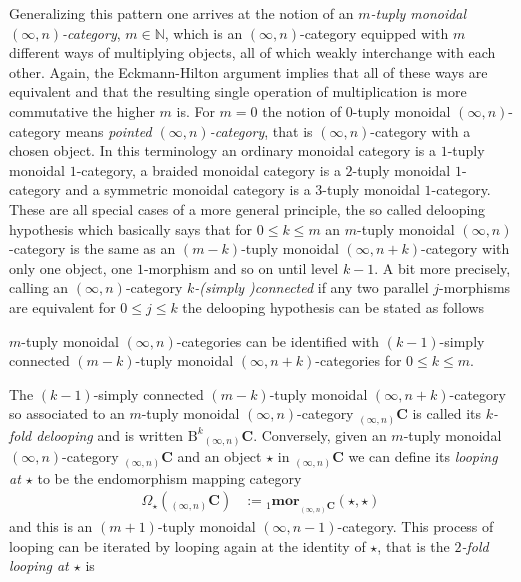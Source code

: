 \begin{itemize}
Generalizing this pattern one arrives at the notion of an \textit{$m$-tuply monoidal $(\infty,n)$-category}, $m \in \mathbb{N}$, which is an $(\infty,n)$-category equipped with $m$ different ways of multiplying objects, all of which weakly interchange with each other. Again, the Eckmann-Hilton argument implies that all of these ways are equivalent and that the resulting {\glqq}single{\grqq} operation of multiplication is more commutative the higher $m$ is. For $m=0$ the notion of $0$-tuply monoidal $(\infty,n)$-category means \textit{pointed $(\infty,n)$-category}, that is $(\infty,n)$-category with a chosen object. In this terminology an ordinary monoidal category is a $1$-tuply monoidal $1$-category, a braided monoidal category is a $2$-tuply monoidal $1$-category and a symmetric monoidal category is a $3$-tuply monoidal $1$-category. These are all special cases of a more general principle, the so called delooping hypothesis which basically says that for $0 \leq k \leq m$ an $m$-tuply monoidal $(\infty,n)$-category is the same as an $(m-k)$-tuply monoidal $(\infty,n+k)$-category with only one object, one $1$-morphism and so on until level $k-1$. A bit more precisely, calling an $(\infty,n)$-category \textit{$k$-(simply )connected} if any two parallel $j$-morphisms are equivalent for $0 \leq j \leq k$ the delooping hypothesis can be stated as follows
\\
\begin{prp}
\label{prp:deloophyp}
$m$-tuply monoidal $(\infty,n)$-categories can be identified with $(k-1)$-simply connected $(m-k)$-tuply monoidal $(\infty,n+k)$-categories for $0 \leq k \leq m$.
\end{prp}
The $(k-1)$-simply connected $(m-k)$-tuply monoidal $(\infty,n+k)$-category so associated to an $m$-tuply monoidal $(\infty,n)$-category ${_{(\infty,n)}}\mathbf{C}$ is called its \textit{$k$-fold delooping} and is written $\mathrm{B}^{k}{_{(\infty,n)}}\mathbf{C}$. Conversely, given an $m$-tuply monoidal $(\infty,n)$-category ${_{(\infty,n)}}\mathbf{C}$ and an object $\star$ in ${_{(\infty,n)}}\mathbf{C}$ we can define its \textit{looping at $\star$} to be the endomorphism mapping category
\begin{align*}
  \Omega_{\star}
  \left(
    {_{(\infty,n)}}\mathbf{C}
  \right)
  &:=
  {_{1}}\mathbf{mor}_{{_{(\infty,n)}}\mathbf{C}}
  (\star,\star)
\end{align*}
and this is an $(m+1)$-tuply monoidal $(\infty,n-1)$-category. This process of looping can be iterated by looping again at the identity of $\star$, that is the \textit{$2$-fold looping at $\star$} is

\end{itemize}
